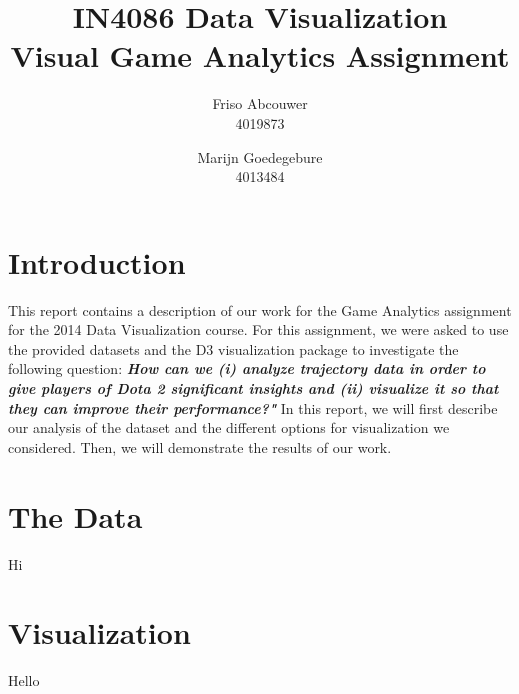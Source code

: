 \documentclass[a4paper,11pt]{article}
\title{IN4086 Data Visualization \\
Visual Game Analytics Assignment \\ }
\author{
Friso Abcouwer \\
4019873 \\
\and
Marijn Goedegebure \\
4013484
}
\begin{document}
\maketitle{}
\newpage

\section{Introduction}
This report contains a description of our work for the Game Analytics assignment for the 2014 Data Visualization course.
For this assignment, we were asked to use the provided datasets and the D3 visualization package to investigate the following question: \textbf{\textit{How can we (i) analyze trajectory data in order to give players of Dota 2 significant insights and (ii) visualize it so that they can improve their performance?"}}
In this report, we will first describe our analysis of the dataset and the different options for visualization we considered. Then, we will demonstrate the results of our work.

\section{The Data}
Hi 

\section{Visualization}
Hello
\end{document}
